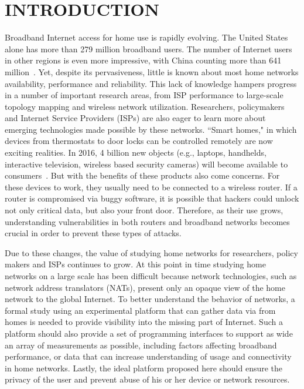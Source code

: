\chapter{INTRODUCTION}
\label{sec.introduction}
Broadband Internet access for home use is rapidly evolving. The United States
alone has more than 279 million broadband users. The number of Internet 
users in other regions is even more impressive, with China counting more 
than 641 million~\cite{asia}. Yet, despite its pervasiveness, little is 
known about most home networks availability, performance and reliability. This lack of knowledge hampers progress in a number of important research 
areas, from ISP performance to large-scale
topology mapping and wireless network utilization. Researchers, policymakers 
and Internet Service Providers (ISPs) are also eager to learn more about 
emerging technologies made possible by these networks. ``Smart homes," in 
which devices from thermostats to door locks can be controlled remotely are
 now exciting realities. In 2016, 4 billion new objects (e.g., laptops, 
handhelds, interactive television, wireless based security cameras) will 
become available to consumers~\cite{gartner}. But with the benefits of these 
products also come concerns. For these devices to work, they usually need to 
be connected to a wireless router. If a router is compromised via buggy 
software, it is possible that hackers could unlock not only critical data, 
but also your front door. Therefore, as their use grows, understanding 
vulnerabilities in both routers and broadband networks becomes crucial in 
order to prevent these types of attacks.

Due to these changes, the value of studying home networks for researchers, 
policy makers and ISPs continues to grow. At this point in time studying 
home networks on a large scale has been difficult because network 
technologies, such as network address translators (NATs), present only an 
opaque view of the home network to the global Internet. To better understand 
the behavior of networks, a formal study using an experimental platform that 
can gather data via from homes  is needed to provide visibility into the 
missing part of Internet. Such a platform should also provide a set of 
programming interfaces to support as wide an array of measurements as 
possible, including factors affecting broadband performance, or data that 
can increase understanding of usage and connectivity in home networks.
Lastly, the ideal platform proposed here should ensure the privacy of the 
user and prevent abuse of his or her device or network resources.

